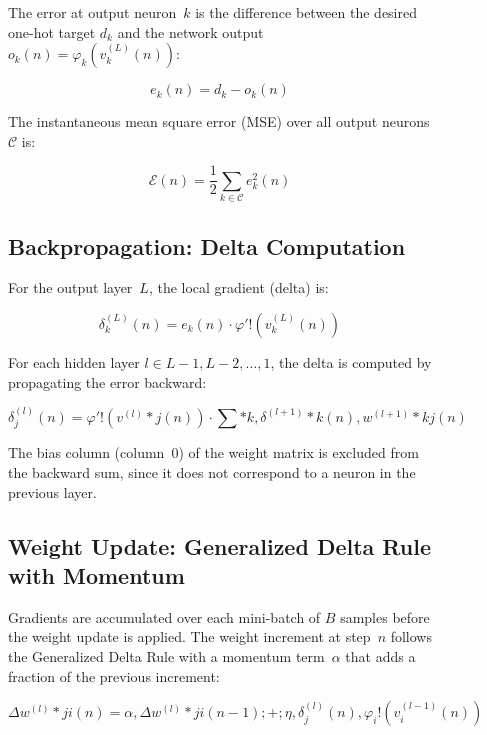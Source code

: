 \documentclass{acm_proc_article-sp} \usepackage{graphicx} \usepackage{amsmath} \usepackage{booktabs} \usepackage{url}
\begin{document}
\begin{figure}[ht]
{The error at output neuron~$k$ is the difference between the desired one-hot target $d_k$ and the network output $o_k(n) = \varphi_k(v^{(L)}_k(n))$:

\begin{equation} e_k(n) = d_k - o_k(n) \label{eq:error_signal} \end{equation}

The instantaneous mean square error (MSE) over all output neurons $\mathcal{C}$ is:

\begin{equation} \mathcal{E}(n) = \frac{1}{2} \sum_{k \in \mathcal{C}} e_k^2(n) \label{eq:mse} \end{equation}

\subsection{Backpropagation: Delta Computation}

For the output layer~$L$, the local gradient (delta) is:

\begin{equation} \delta^{(L)}_k(n) = e_k(n) \cdot \varphi'!\left(v^{(L)}_k(n)\right) \label{eq:delta_output} \end{equation}

For each hidden layer $l \in {L-1, L-2, \dots, 1}$, the delta is computed by propagating the error backward:

\begin{equation} \delta^{(l)}_j(n) = \varphi'!\left(v^{(l)}*j(n)\right) \cdot \sum*{k}, \delta^{(l+1)}*k(n), w^{(l+1)}*{kj}(n) \label{eq:delta_hidden} \end{equation}

The bias column (column~0) of the weight matrix is excluded from the backward sum, since it does not correspond to a neuron in the previous layer.

\subsection{Weight Update: Generalized Delta Rule with Momentum}

Gradients are accumulated over each mini-batch of $B$ samples before the weight update is applied. The weight increment at step~$n$ follows the Generalized Delta Rule with a momentum term~$\alpha$ that adds a fraction of the previous increment:

\begin{equation} \Delta w^{(l)}*{ji}(n) = \alpha,\Delta w^{(l)}*{ji}(n-1) ;+; \eta,\delta^{(l)}_j(n),\varphi_i!\left(v^{(l-1)}_i(n)\right) \label{eq:weight_increment} \end{equation}

}
\end{figure}
\end{document}
